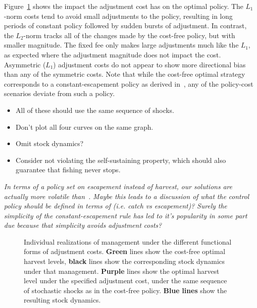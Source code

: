 \documentclass[authoryear, review, 12pt]{elsarticle}
\newcommand{\cdb}[1]{{\it \color{darkgreen} #1}}
\begin{document}
Figure~\ref{fig:shapes} shows the impact the adjustment cost has on the optimal policy.  The $L_1$-norm costs tend to avoid small adjustments to the policy, resulting in long periods of constant policy followed by sudden bursts of adjustment.  In contrast, the $L_2$-norm tracks all of the changes made by the cost-free policy, but with smaller magnitude.  The fixed fee only makes large adjustments much like the $L_1$, as expected where the adjustment magnitude does not impact the cost.  Asymmetric ($L_1$) adjustment costs do not appear to show more directional bias than any of the symmetric costs.  Note that while the cost-free optimal strategy corresponds to a constant-escapement policy as derived in~\citet{Reed1979}, any of the policy-cost scenarios deviate from such a policy.  
    \cdb{
    \begin{itemize}
      \item All of these should use the same sequence of shocks.  
      \item Don't plot all four curves on the same graph.  
      \item Omit stock dynamics?
      \item Consider not violating the self-sustaining property, which should also guarantee that fishing never stops.   
    \end{itemize}
    }

\cdb{ In terms of a policy set on escapement instead of harvest, our solutions are actually more volatile than~\citet{Reed1979}.  Maybe this leads to a discussion of what the control policy should be defined in terms of (i.e. catch vs escapement)?  Surely the simplicity of the constant-escapement rule has led to it's popularity in some part due because that simplicity avoids adjustment costs?}

  \begin{figure}
    \begin{center}

  \end{center}
  \caption{Individual realizations of management under the different functional forms of adjustment costs.  \textbf{Green} lines show the cost-free optimal harvest levels, \textbf{black} lines show the corresponding stock dynamics under that management.  \textbf{Purple} lines show the optimal harvest level under the specified adjustment cost, under the same sequence of stochastic shocks as in the cost-free policy.  \textbf{Blue lines} show the resulting stock dynamics.
  } \label{fig:shapes}
\end{figure}
\end{document}
